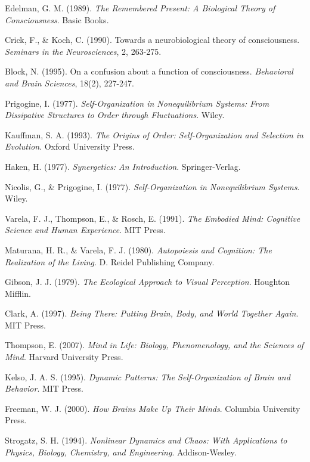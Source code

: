 \documentclass{article}
\begin{document}
\begin{thebibliography}{99}
Edelman, G. M. (1989). \textit{The Remembered Present: A Biological Theory of Consciousness}. Basic Books.

Crick, F., \& Koch, C. (1990). Towards a neurobiological theory of consciousness. \textit{Seminars in the Neurosciences}, 2, 263-275.

Block, N. (1995). On a confusion about a function of consciousness. \textit{Behavioral and Brain Sciences}, 18(2), 227-247.

Prigogine, I. (1977). \textit{Self-Organization in Nonequilibrium Systems: From Dissipative Structures to Order through Fluctuations}. Wiley.

Kauffman, S. A. (1993). \textit{The Origins of Order: Self-Organization and Selection in Evolution}. Oxford University Press.

Haken, H. (1977). \textit{Synergetics: An Introduction}. Springer-Verlag.

Nicolis, G., \& Prigogine, I. (1977). \textit{Self-Organization in Nonequilibrium Systems}. Wiley.

Varela, F. J., Thompson, E., \& Rosch, E. (1991). \textit{The Embodied Mind: Cognitive Science and Human Experience}. MIT Press.

Maturana, H. R., \& Varela, F. J. (1980). \textit{Autopoiesis and Cognition: The Realization of the Living}. D. Reidel Publishing Company.

Gibson, J. J. (1979). \textit{The Ecological Approach to Visual Perception}. Houghton Mifflin.

Clark, A. (1997). \textit{Being There: Putting Brain, Body, and World Together Again}. MIT Press.

Thompson, E. (2007). \textit{Mind in Life: Biology, Phenomenology, and the Sciences of Mind}. Harvard University Press.

Kelso, J. A. S. (1995). \textit{Dynamic Patterns: The Self-Organization of Brain and Behavior}. MIT Press.

Freeman, W. J. (2000). \textit{How Brains Make Up Their Minds}. Columbia University Press.

Strogatz, S. H. (1994). \textit{Nonlinear Dynamics and Chaos: With Applications to Physics, Biology, Chemistry, and Engineering}. Addison-Wesley.


\end{thebibliography}
\end{document}
